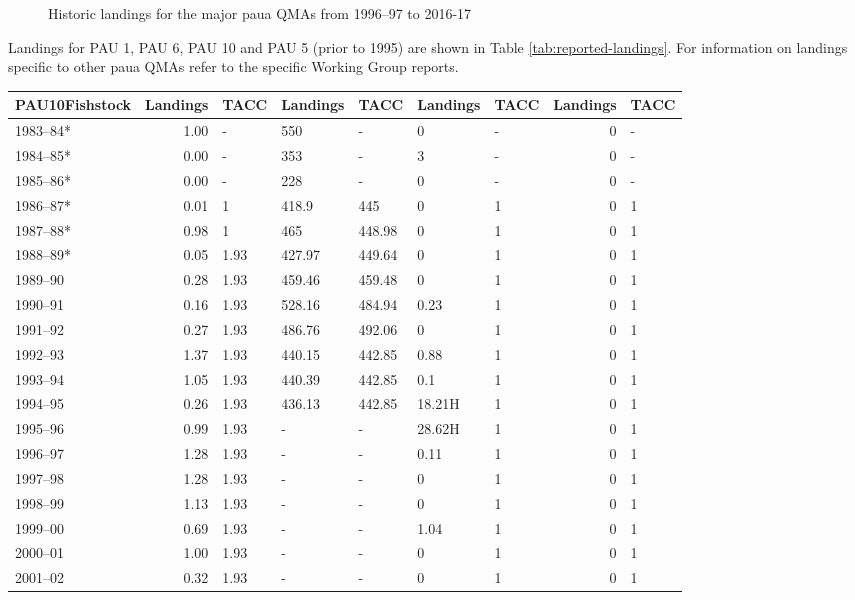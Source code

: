 \documentclass{mpi-plenary}
\theoremstyle{definition}
\theoremstyle{definition}
\theoremstyle{definition}
\theoremstyle{remark}
\begin{document}
\begin{figure}

\caption{Historic landings for the major paua QMAs from 1996–97 to 2016-17}\label{fig:weight-by-fishing-year-2}
\end{figure}

Landings for PAU 1, PAU 6, PAU 10 and PAU 5 (prior to 1995) are shown in
Table \ref{tab:reported-landings}. For information on landings specific
to other paua QMAs refer to the specific Working Group reports.

\begin{tabular}{l|r|l|l|l|l|l|r|l}
\hline
PAU10Fishstock & Landings & TACC & Landings & TACC & Landings & TACC & Landings & TACC\\
\hline
1983–84* & 1.00 & - & 550 & - & 0 & - & 0 & -\\
\hline
1984–85* & 0.00 & - & 353 & - & 3 & - & 0 & -\\
\hline
1985–86* & 0.00 & - & 228 & - & 0 & - & 0 & -\\
\hline
1986–87* & 0.01 & 1 & 418.9 & 445 & 0 & 1 & 0 & 1\\
\hline
1987–88* & 0.98 & 1 & 465 & 448.98 & 0 & 1 & 0 & 1\\
\hline
1988–89* & 0.05 & 1.93 & 427.97 & 449.64 & 0 & 1 & 0 & 1\\
\hline
1989–90 & 0.28 & 1.93 & 459.46 & 459.48 & 0 & 1 & 0 & 1\\
\hline
1990–91 & 0.16 & 1.93 & 528.16 & 484.94 & 0.23 & 1 & 0 & 1\\
\hline
1991–92 & 0.27 & 1.93 & 486.76 & 492.06 & 0 & 1 & 0 & 1\\
\hline
1992–93 & 1.37 & 1.93 & 440.15 & 442.85 & 0.88 & 1 & 0 & 1\\
\hline
1993–94 & 1.05 & 1.93 & 440.39 & 442.85 & 0.1 & 1 & 0 & 1\\
\hline
1994–95 & 0.26 & 1.93 & 436.13 & 442.85 & 18.21H & 1 & 0 & 1\\
\hline
1995–96 & 0.99 & 1.93 & - & - & 28.62H & 1 & 0 & 1\\
\hline
1996–97 & 1.28 & 1.93 & - & - & 0.11 & 1 & 0 & 1\\
\hline
1997–98 & 1.28 & 1.93 & - & - & 0 & 1 & 0 & 1\\
\hline
1998–99 & 1.13 & 1.93 & - & - & 0 & 1 & 0 & 1\\
\hline
1999–00 & 0.69 & 1.93 & - & - & 1.04 & 1 & 0 & 1\\
\hline
2000–01 & 1.00 & 1.93 & - & - & 0 & 1 & 0 & 1\\
\hline
2001–02 & 0.32 & 1.93 & - & - & 0 & 1 & 0 & 1\\

\end{tabular}
\end{document}
